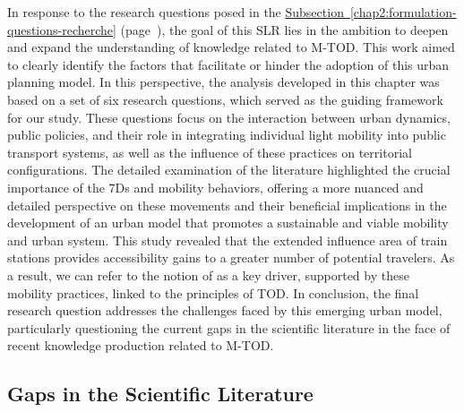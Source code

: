\begin{refsegment}
In response to the research questions posed in the \hyperref[chap2:formulation-questions-recherche]{Subsection~\ref{chap2:formulation-questions-recherche}} (page~\pageref{chap2:formulation-questions-recherche}), the goal of this \acrshort{SLR} lies in the ambition to deepen and expand the understanding of knowledge related to \acrshort{M-TOD}. This work aimed to clearly identify the factors that facilitate or hinder the adoption of this urban planning model. In this perspective, the analysis developed in this chapter was based on a set of six research questions, which served as the guiding framework for our study. These questions focus on the interaction between urban dynamics, public policies, and their role in integrating individual light mobility into public transport systems, as well as the influence of these practices on territorial configurations. The detailed examination of the literature highlighted the crucial importance of the \acrshort{7Ds} and mobility behaviors, offering a more nuanced and detailed perspective on these movements and their beneficial implications in the development of an urban model that promotes a sustainable and viable mobility and urban system. This study revealed that the extended influence area of train stations provides accessibility gains to a greater number of potential travelers. As a result, we can refer to the notion of  \textcolor{blue}{\autocite[86]{kaufmann_retour_2014}} as a key driver, supported by these mobility practices, linked to the principles of \acrshort{TOD}. In conclusion, the final research question addresses the challenges faced by this emerging urban model, particularly questioning the current gaps in the scientific literature in the face of recent knowledge production related to \acrshort{M-TOD}.%

\subsection*{Gaps in the Scientific Literature
    \label{chap2:literature-gap}
    }


\end{refsegment}
